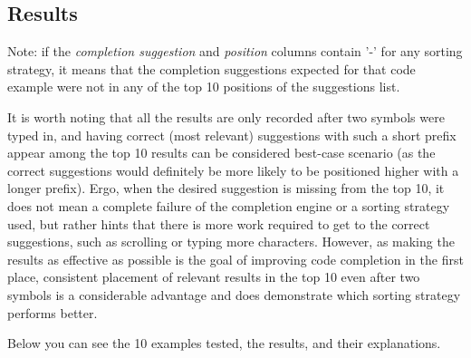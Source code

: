 \subsection{Results}
Note: if the \textit{completion suggestion} and \textit{position} columns contain '-' for any sorting strategy, it means that the completion suggestions expected for that code example were not in any of the top 10 positions of the suggestions list.

It is worth noting that all the results are only recorded after two symbols were typed in, and having correct (most relevant) suggestions with such a short prefix appear among the top 10 results can be considered best-case scenario (as the correct suggestions would definitely be more likely to be positioned higher with a longer prefix). Ergo, when the desired suggestion is missing from the top 10, it does not mean a complete failure of the completion engine or a sorting strategy used, but rather hints that there is more work required to get to the correct suggestions, such as scrolling or typing more characters. However, as making the results as effective as possible is the goal of improving code completion in the first place, consistent placement of relevant results in the top 10 even after two symbols is a considerable advantage and does demonstrate which sorting strategy performs better.

Below you can see the 10 examples tested, the results, and their explanations.

